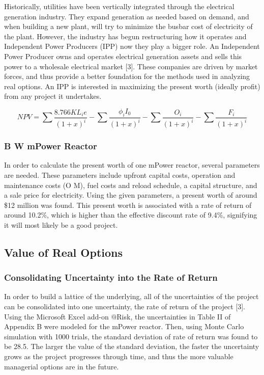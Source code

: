 Historically, utilities have been vertically integrated through the electrical generation industry.  They expand generation as needed based on demand, and when building a new plant, will try to minimize the busbar cost of electricity of the plant.  However, the industry has begun restructuring how it operates and Independent Power Producers (IPP) now they play a bigger role.  An Independent Power Producer owns and operates electrical generation assets and sells this power to a wholesale electrical market [3].  These companies are driven by market forces, and thus provide a better foundation for the methods used in analyzing real options.  An IPP is interested in maximizing the present worth (ideally profit) from any project it undertakes.    

\begin{equation}
	NPV = \sum \frac{8.766 K L_i e}{ (1+x)^i }  -
		\sum \frac{ \phi_i I_0}{ (1+x)^i } -
		\sum \frac{ O_i }{ (1+x)^i } -
		\sum \frac{ F_i }{ (1+x)^i }
\end{equation}

\subsubsection{B W mPower Reactor}

In order to calculate the present worth of one mPower reactor, several parameters are needed.  These parameters include upfront capital costs, operation and maintenance costs (O M), fuel costs and reload schedule, a capital structure, and a sale price for electricity.  Using the given parameters, a present worth of around \$12 million was found.  This present worth is associated with a rate of return of around 10.2\%, which is higher than the effective discount rate of 9.4\%, signifying it will most likely be a good project.

\subsection{Value of Real Options}
\subsubsection{Consolidating Uncertainty into the Rate of Return}

In order to build a lattice of the underlying, all of the uncertainties of the project can be consolidated into one uncertainty, the rate of return of the project [3].  Using the Microsoft Excel add-on  $@$Risk, the uncertainties in Table II of Appendix B were modeled for the mPower reactor.  Then, using Monte Carlo simulation with 1000 trials, the standard deviation of rate of return was found to be 28.5.  The larger the value of the standard deviation, the faster the uncertainty grows as the project progresses through time, and thus the more valuable managerial options are in the future.  

